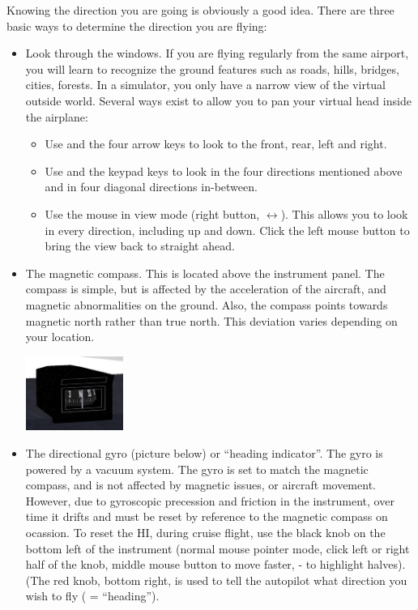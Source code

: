 Knowing the direction you are going is obviously a good idea. There are three 
basic ways to determine the direction you are flying:
\begin{itemize}
	\item Look through the windows. If you are flying regularly from the same
  airport, you will learn to recognize the ground features such as roads, hills, 
  bridges, cities, forests. In a simulator, you only have a narrow view of the
  virtual outside world. Several ways exist to allow you to pan your virtual 
  head inside the airplane: 
	  \begin{itemize}
    	\item Use  and the four arrow keys to 
      look to the front, rear, left and right.
    	\item Use  and the keypad keys to look in the 
      four directions mentioned above and in four diagonal directions 
      in-between.
    	\item Use the mouse in view mode (right button, $\leftrightarrow$). This 
      allows you to look in every direction, including up and down. Click the 
      left mouse button to bring the view back to straight ahead.
    \end{itemize}
 \item The magnetic compass. This is located above the instrument panel. The 
 compass is simple, but is affected by the acceleration of the aircraft, and
 magnetic abnormalities on the ground. Also, the compass points towards magnetic
 north rather than true north. This deviation varies depending on your location.

\begin{center}
\includegraphics[width=0.25\textwidth]{img/tut_36}
\end{center}


  \item The directional gyro (picture below) or ``heading indicator''. The 
  gyro is powered by a vacuum system. The gyro is set to match the magnetic 
  compass, and is not affected by magnetic issues, or aircraft movement. 
  However, due to gyroscopic precession and friction in the instrument, over
  time it drifts and must be reset by reference to the magnetic compass on
  ocassion. To reset the HI, during cruise flight, use the black knob on the
  bottom left of the instrument
  (normal mouse pointer mode, click left or right half of the knob, middle 
  mouse button to move faster, - to highlight halves). 
  (The red knob, bottom right, is used to tell the autopilot what direction 
  you wish to fly (\textcolor{red}{} = ``heading'').


\end{itemize}
